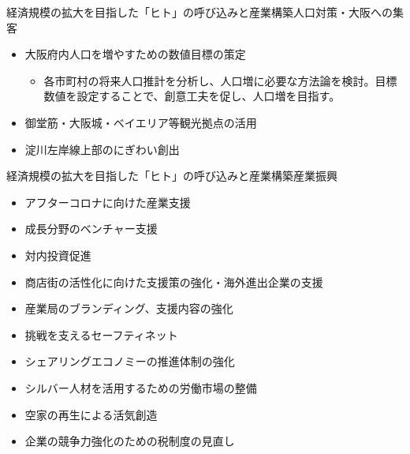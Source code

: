 \documentclass[dvipdfmx]{beamer}
\begin{document}
    \begin{frame}{\normalsize 経済規模の拡大を目指した「ヒト」の呼び込みと産業構築}{人口対策・大阪への集客}
        \begin{small}
            \begin{itemize}
                \setlength{\itemsep}{2mm}
                \item 大阪府内人口を増やすための数値目標の策定
                \vspace{2mm}
                \begin{itemize}
                    \item 各市町村の将来人口推計を分析し、人口増に必要な方法論を検討。目標数値を設定することで、創意工夫を促し、人口増を目指す。
                \end{itemize}
                \item 御堂筋・大阪城・ベイエリア等観光拠点の活用
                \item 淀川左岸線上部のにぎわい創出
            \end{itemize}
        \end{small}
    \end{frame}

    \begin{frame}{\normalsize 経済規模の拡大を目指した「ヒト」の呼び込みと産業構築}{産業振興}
        \begin{small}
            \begin{itemize}
                \setlength{\itemsep}{2mm}
                \item アフターコロナに向けた産業支援
                \item 成長分野のベンチャー支援
                \item 対内投資促進
                \item \alert{商店街の活性化に向けた支援策の強化・海外進出企業の支援}
                \item 産業局のブランディング、支援内容の強化
                \item 挑戦を支えるセーフティネット
                \item シェアリングエコノミーの推進体制の強化
                \item シルバー人材を活用するための労働市場の整備
                \item 空家の再生による活気創造
                \item 企業の競争力強化のための税制度の見直し
            \end{itemize}
        \end{small}
    \end{frame}
\end{document}
